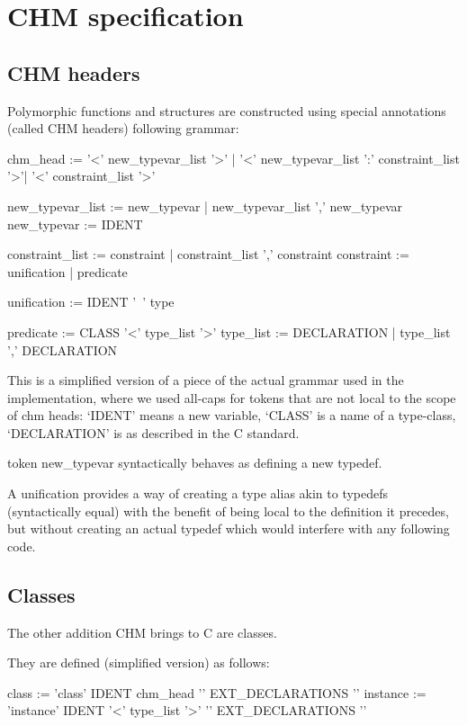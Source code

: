 \section{CHM specification}

\subsection{CHM headers}

Polymorphic functions and structures are constructed using special annotations (called CHM headers) following grammar:

chm_head := '<' new_typevar_list '>' | '<' new_typevar_list ':' constraint_list '>'| '<' constraint_list '>'

new_typevar_list := new_typevar | new_typevar_list ',' new_typevar
new_typevar := IDENT

constraint_list := constraint | constraint_list ',' constraint
constraint := unification | predicate

unification := IDENT '~' type

predicate := CLASS '<' type_list '>'
type_list := DECLARATION | type_list ',' DECLARATION

This is a simplified version of a piece of the actual grammar used in the implementation,
where we used all-caps for tokens that are not local to the scope of chm heads: `IDENT' means a new variable,
`CLASS' is a name of a type-class, %
`DECLARATION' is as described in the C standard.

token new_typevar syntactically behaves as defining a new typedef.

A unification provides a way of creating a type alias akin to typedefs (syntactically equal) with the benefit of being local to the definition
it precedes, but without creating an actual typedef which would interfere with any following code.

\subsection{Classes}

The other addition CHM brings to C are classes.

They are defined (simplified version) as follows:

class := 'class' IDENT chm_head '{' EXT_DECLARATIONS '}'
instance := 'instance' IDENT '<' type_list '>' '{' EXT_DECLARATIONS '}'


